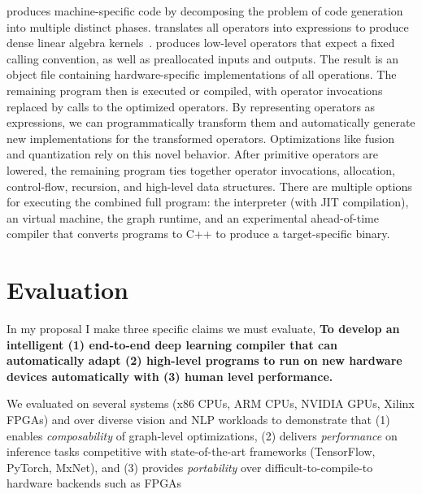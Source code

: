       \relay produces machine-specific code
        by decomposing the problem of code generation into multiple distinct phases.
      \relay translates all operators into \tvm expressions
        to produce dense linear algebra kernels~\cite{tvm_osdi18, tensor_comprehensions, halide}.
      \tvm produces low-level operators that expect a fixed calling convention,
        as well as preallocated inputs and outputs.
      The result is an object file containing hardware-specific implementations of all
        operations.
      The remaining \relay program then is executed or compiled,
        with operator invocations replaced by calls to the optimized operators.
      By representing operators as \tvm expressions, we can programmatically
        transform them and automatically generate new implementations for the transformed operators.
      Optimizations like fusion and quantization
        rely on this novel behavior.
      After primitive operators are lowered,
        the remaining \relay program ties
        together operator invocations, allocation, control-flow,
        recursion, and high-level data structures.
      There are multiple options for executing the combined full program:
        the \relay interpreter (with JIT compilation),
        an \relay virtual machine,
        the \tvm graph runtime,
        and an experimental \relay ahead-of-time compiler
        that converts programs to C++ to produce a target-specific binary.


      \section{Evaluation}
\label{sec:eval}


In my proposal I make three specific claims we must evaluate,
\textbf{To develop an intelligent (1) end-to-end deep learning compiler that can
automatically adapt (2) high-level programs to run on new hardware devices automatically
with (3) human level performance.}

We evaluated \relay on several systems (x86 CPUs, ARM CPUs, NVIDIA GPUs, Xilinx FPGAs) and over
  diverse vision and NLP workloads to demonstrate that (1) \relay enables \emph{composability} of
  graph-level optimizations, (2) \relay delivers \emph{performance} on inference tasks competitive
  with state-of-the-art frameworks (TensorFlow, PyTorch, MxNet), and (3) \relay provides
  \emph{portability} over difficult-to-compile-to hardware backends such as FPGAs

